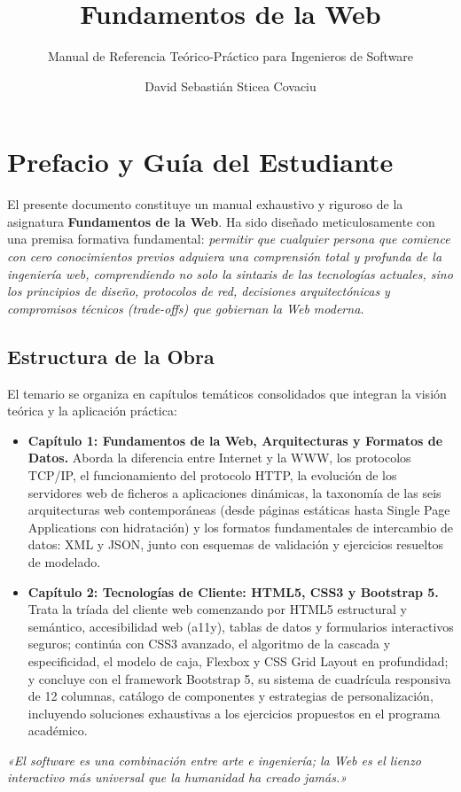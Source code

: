 \documentclass[11pt,a4paper,oneside,blue]{apuntes}
\title{Fundamentos de la Web}
\subtitle{Manual de Referencia Teórico-Práctico para Ingenieros de Software}
\author{David Sebastián Sticea Covaciu}
\begin{document}
\makecover

\chapter*{Prefacio y Guía del Estudiante}

El presente documento constituye un manual exhaustivo y riguroso de la asignatura \textbf{Fundamentos de la Web}. Ha sido diseñado meticulosamente con una premisa formativa fundamental: \textit{permitir que cualquier persona que comience con cero conocimientos previos adquiera una comprensión total y profunda de la ingeniería web, comprendiendo no solo la sintaxis de las tecnologías actuales, sino los principios de diseño, protocolos de red, decisiones arquitectónicas y compromisos técnicos (trade-offs) que gobiernan la Web moderna.}

\section*{Estructura de la Obra}
El temario se organiza en capítulos temáticos consolidados que integran la visión teórica y la aplicación práctica:
\begin{itemize}[leftmargin=1.5cm]
  \item \textbf{Capítulo 1: Fundamentos de la Web, Arquitecturas y Formatos de Datos.} Aborda la diferencia entre Internet y la WWW, los protocolos TCP/IP, el funcionamiento del protocolo HTTP, la evolución de los servidores web de ficheros a aplicaciones dinámicas, la taxonomía de las seis arquitecturas web contemporáneas (desde páginas estáticas hasta Single Page Applications con hidratación) y los formatos fundamentales de intercambio de datos: XML y JSON, junto con esquemas de validación y ejercicios resueltos de modelado.
  \item \textbf{Capítulo 2: Tecnologías de Cliente: HTML5, CSS3 y Bootstrap 5.} Trata la tríada del cliente web comenzando por HTML5 estructural y semántico, accesibilidad web (a11y), tablas de datos y formularios interactivos seguros; continúa con CSS3 avanzado, el algoritmo de la cascada y especificidad, el modelo de caja, Flexbox y CSS Grid Layout en profundidad; y concluye con el framework Bootstrap 5, su sistema de cuadrícula responsiva de 12 columnas, catálogo de componentes y estrategias de personalización, incluyendo soluciones exhaustivas a los ejercicios propuestos en el programa académico.
\end{itemize}

\vspace{1cm}
\begin{center}
  \textit{«El software es una combinación entre arte e ingeniería; la Web es el lienzo interactivo más universal que la humanidad ha creado jamás.»}
\end{center}

\newpage

\tableofcontents
\newpage




\end{document}
